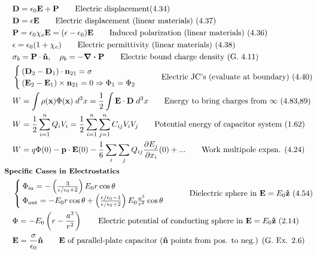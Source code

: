 \documentclass[10pt]{article}
\newcommand{\zhat}{\boldsymbol{\hat{\textbf{z}}}}
\newcommand{\nhat}{\boldsymbol{\hat{\textbf{n}}}}
\newcommand{\ve}[1]{\boldsymbol{\mathbf{#1}}}
\newcommand{\vect}[1]{\boldsymbol{\mathbf{#1}}}
\newcommand{\eo}{\epsilon_0}
\newcommand{\pder}[2]{\frac{\partial #1}{\partial #2}}
\begin{document}
\begin{multicols}{2}
\begin{align*}
		& \vect{D} = \eo \vect{E} + \vect{P} \tag*{Electric displacement(4.34)} \\
		& \vect{D} = \epsilon \vect{E} \tag*{Electric displacement (linear materials) (4.37)} \\
		& \vect{P} = \eo \chi_e \vect{E} = (\epsilon - \eo) \ve{E} \tag*{Induced polarization (linear materials) (4.36)} \\
		& \epsilon = \eo (1 + \chi_e) \tag*{Electric permittivity (linear materials) (4.38)} \\
		& \sigma_b = \ve{P} \cdot \nhat, \quad \rho_b = - \ve{\nabla \cdot P} \tag*{Electric bound charge density (G. 4.11)} \\
		& \begin{cases}
			(\vect{D}_2 - \vect{D}_1) \cdot \vect{n}_{21} = \sigma \\
			(\vect{E}_2 - \vect{E}_1) \times \vect{n}_{21} = 0 \Rightarrow \Phi_1 = \Phi_2 \\
		\end{cases}	\tag*{Electric JC's (evaluate at boundary) (4.40)} \\		
		& W = \int \rho(\vect{x}) \Phi(\vect{x})\; d^3x = \frac{1}{2} \int \vect{E} \cdot \vect{D} \; d^3x \tag*{Energy to bring charges from $\infty$ (4.83,89)} \\
		& W = \frac{1}{2} \sum_{i=1}^{n} Q_i V_i = \frac{1}{2} \sum_{i=1}^n \sum_{j=1}^{n} C_{ij} V_i V_j	\tag*{Potential energy of capacitor system (1.62)} \\	
		& W = q \Phi(0) - \vect{p} \cdot \vect{E}(0) - \frac{1}{6} \sum_i \sum_j Q_{ij} \pder{E_j}{x_i}(0) + ... \tag*{Work multipole expsn. (4.24)} \\
	& \small \hspace{-10pt} \textbf{Specific Cases in Electrostatics} \small \\
		&\begin{cases}
			\Phi_{\text{in}} = - \left( \frac{3}{\epsilon/\eo + 2} \right) E_0 r \cos \theta \\ 
			\Phi_{\text{out}} = - E_0 r \cos \theta + \left( \frac{\epsilon/\eo - 1}{\epsilon/\eo + 2} \right) E_0 \frac{a^3}{r^2} \cos \theta 
		\end{cases} \tag*{Dielectric sphere in $\vect{E} = E_0 \zhat$ (4.54)} \\
		& \Phi = -E_0 \left( r - \frac{a^3}{r^2} \right)	\tag*{Electric potential of conducting sphere in $\vect{E} = E_0 \zhat$ (2.14)} \\
		& \ve{E} = \frac{\sigma}{\eo} \nhat \tag*{$\ve{E}$ of parallel-plate capacitor ($\nhat$ points from pos. to neg.) (G. Ex. 2.6)} \\

\end{align*}
\end{multicols}
\end{document}
